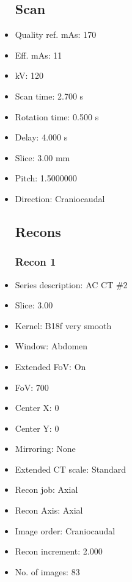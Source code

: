 \documentclass[12pt]{article}
\begin{document}
\begin{itemize}[noitemsep]
\subsection{Scan}
\item Quality ref. mAs: 170\item Eff. mAs: 11\item kV: 120\item Scan time: 2.700 s\item Rotation time: 0.500 s\item Delay: 4.000 s\item Slice: 3.00 mm\item Pitch: 1.5000000\item Direction: Craniocaudal\subsection{Recons}

\subsubsection{Recon 1}
\item Series description: AC CT \#2
\item Slice: 3.00
\item Kernel: B18f very smooth
\item Window: Abdomen
\item Extended FoV: On
\item FoV: 700
\item Center X: 0
\item Center Y: 0
\item Mirroring: None
\item Extended CT scale: Standard
\item Recon job: Axial
\item Recon Axis: Axial
\item Image order: Craniocaudal
\item Recon increment: 2.000
\item No. of images: 83
\end{itemize}
\end{document}
